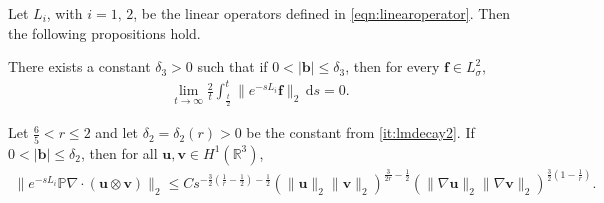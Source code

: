 \documentclass[10pt,a4paper]{amsart}
\newcommand{\Bf}{{\boldsymbol{f}}}
\newcommand{\R}{\mathbb{R}}
\newcommand{\bb}{{\boldsymbol{b}}}
\newcommand{\bu}{{\boldsymbol{u}}}
\newcommand{\bv}{{\boldsymbol{v}}}
\begin{document}
\begin{proposition} \label{lemma:a}
Let $L_i$, with $i =1,\,2$, be the linear operators defined in \cref{eqn:linearoperator}. Then the following propositions hold.
\begin{propenum}
\item \label{it:lma1} There exists a constant $\delta_3>0$ such that if $0<|\bb|\le \delta_3$, then for every $\Bf\in L^2_{\sigma}$,
\begin{align}\label{eqn:linearpart}
    \lim\limits_{t\to\infty} \frac{2}{t} \int_{\frac{t}{2}}^t \|e^{-sL_i}\Bf\|_2 \, \mathrm d s=0.
\end{align}    
 \item \label{it:lma2} Let $\frac{6}{5}<r\le2$ and let $\delta_2 = \delta_2(r) > 0$ be the constant from \cref{it:lmdecay2}. If $0<|\bb|\le \delta_2$, then for all $\bu,\bv\in H^1(\R^3)$,
    \begin{align}\label{eqn:nonlinearpart}
    \|e^{-sL_i} \mathbb{P} \nabla\cdot (\bu\otimes \bv)\|_2 \le C s^{-\frac{3}{2}\left(\frac{1}{r}-\frac{1}{2}\right)-\frac{1}{2}} 
    (\|\bu\|_2\|\bv\|_2)^{\frac{3}{2r}-\frac{1}{2}} (\|\nabla\bu\|_2\|\nabla \bv\|_2)^{\frac{3}{2}(1-\frac{1}{r})}.
    \end{align}
\end{propenum}
\end{proposition}
\end{document}

